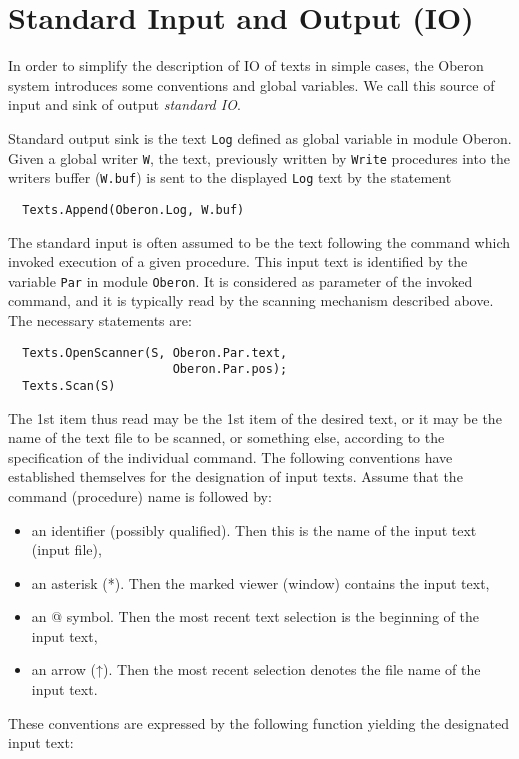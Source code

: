 \section{Standard Input and Output (IO)}
\label{sec:stdio}
In order to simplify the description of IO of texts in simple cases, the Oberon system
introduces some conventions and global variables. We call this source of input and sink
of output \emph{standard IO}.

Standard output sink is the text \verb|Log| defined as global variable in module Oberon.
Given a global writer \verb|W|, the text, previously written by \verb|Write| procedures into
the writers buffer (\verb|W.buf|) is sent to the displayed \verb|Log| text by the statement
\begin{verbatim}
  Texts.Append(Oberon.Log, W.buf)
\end{verbatim}
The standard input is often assumed to be the text following the command which invoked
execution of a given procedure. This input text is identified by the variable \verb|Par|
in module \verb|Oberon|. It is considered as parameter of the invoked command, and it is
typically read by the scanning mechanism described above. The necessary statements are:
\begin{verbatim}
  Texts.OpenScanner(S, Oberon.Par.text,
                       Oberon.Par.pos);
  Texts.Scan(S)
\end{verbatim}
The 1st item thus read may be the 1st item of the desired text, or it may be the name of
the text file to be scanned, or something else, according to the specification of the
individual command. The following conventions have established themselves for the
designation of input texts. Assume that the command (procedure) name is followed by:
\begin{itemize}
  \item an identifier (possibly qualified). Then this is the name of the input text (input file),
  \item an asterisk (*). Then the marked viewer (window) contains the input text,
  \item an @ symbol. Then the most recent text selection is the beginning of the input text,
  \item an arrow (↑). Then the most recent selection denotes the file name of the input text.
\end{itemize}
These conventions are expressed by the following function yielding the designated input text:
